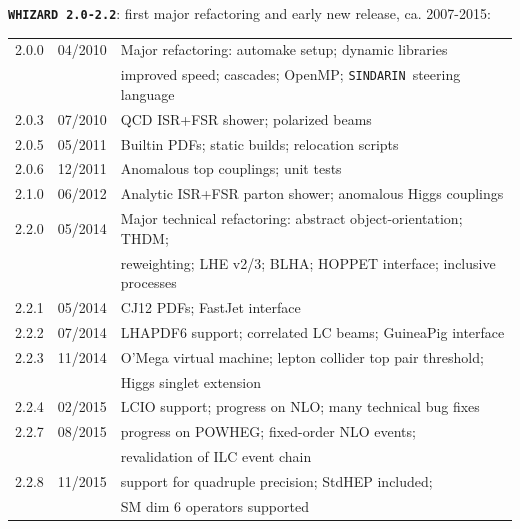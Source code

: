 \documentclass[12pt]{book}
\newcommand{\ttt}[1]{\texttt{#1}}
\newcommand{\whizard}{\ttt{WHIZARD}}
\newcommand{\sindarin}{\ttt{SINDARIN}}
\begin{document}
{
{\bf \whizard\ \texttt{2.0-2.2}}: first major refactoring and early new
release, ca. 2007-2015:
\nopagebreak[4]
\begin{center}
\begin{tabular}{|l|l|l|}\hline
  2.0.0 & 04/2010 & Major refactoring: automake setup; dynamic
  libraries \\
  & & improved speed; cascades; OpenMP; \sindarin\ steering language \\
  2.0.3 & 07/2010 & QCD ISR+FSR shower; polarized beams \\
  2.0.5 & 05/2011 & Builtin PDFs; static builds; relocation scripts \\
  2.0.6 & 12/2011 & Anomalous top couplings; unit tests \\\hline
  2.1.0 & 06/2012 & Analytic ISR+FSR parton shower; anomalous Higgs
  couplings \\\hline
  2.2.0 & 05/2014 & Major technical refactoring: abstract
  object-orientation; THDM; \\
  & & reweighting; LHE v2/3; BLHA; HOPPET interface; inclusive
  processes \\
  2.2.1 & 05/2014 & CJ12 PDFs; FastJet interface \\
  2.2.2 & 07/2014 & LHAPDF6 support; correlated LC beams; GuineaPig
  interface \\
  2.2.3 & 11/2014 & O'Mega virtual machine; lepton collider top
  pair threshold; \\
  & & Higgs singlet extension \\
  2.2.4 & 02/2015 & LCIO support; progress on NLO; many technical
  bug fixes \\
  2.2.7 & 08/2015 & progress on POWHEG; fixed-order NLO events; \\
  & & revalidation of ILC event chain \\
  2.2.8 & 11/2015 & support for quadruple precision; StdHEP included; \\
  & & SM dim 6 operators supported
  \\\hline
\end{tabular}
\end{center}
}

\newpage
\end{document}
